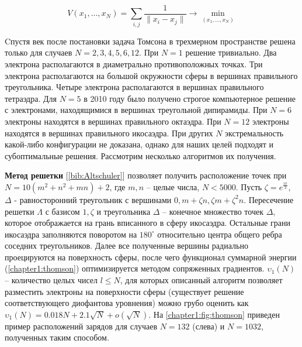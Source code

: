 \begin{equation}\label{chapter1:thomson}
V(x_1, \dots, x_N) = \sum\limits_{i,j} \frac{1}{ \|x_i-x_j\| } \to \min\limits_{(x_1, \dots, x_N)}
\end{equation}

Cпустя век после постановки задача Томсона в трехмерном пространстве решена только для случаев 
$N = 2, 3, 4, 5, 6, 12$. 
При $N = 1$ решение тривиально. 
Два электрона располагаются в диаметрально противоположных точках.
Три электрона располагаются на большой окружности сферы в вершинах правильного треугольника.
Четыре электрона располагаются в вершинах правильного тетраэдра.
Для $N = 5$ в 2010 году было получено строгое компьютерное решение с электронами, находящимися в вершинах треугольной дипирамиды.
При $N = 6$ электроны находятся в вершинах правильного октаэдра.
При $N = 12$ электроны находятся в вершинах правильного икосаэдра.
При других $N$ экстремальность какой-либо конфигурации не доказана, 
однако для наших целей подходят и субоптимальные решения. Рассмотрим несколько алгоритмов их получения.

\textbf{Метод решетки} [\ref{bib:Altschuler}] позволяет получить расположение точек при $N = 10(m^2 + n^2 + mn) + 2$, 
где $m,n$ -- целые числа, $N < 5000$. 
Пусть $\zeta = e^{\frac{i\pi}{3}}$, $\Delta$ - 
равносторонний треугольник с вершинами $0, m + \zeta n, \zeta m + \zeta^2 n$. Пересечение решетки $\Lambda$ с базисом $1, \zeta$ 
и треугольника $\Delta$ -- конечное множество точек $\Delta$, которое отображается на грань вписанного в сферу икосаэдра. 
Остальные грани икосаэдра заполняются поворотом на $180^{\circ}$ относительно центра общего ребра соседних треугольников. 
Далее все полученные вершины радиально проецируются на поверхность сферы, после чего функционал суммарной энергии 
(\ref{chapter1:thomson}) оптимизируется методом сопряженных градиентов. 
$\upsilon_1(N)$ -- количество целых чисел $l \le N$, для которых описанный алгоритм позволяет разместить электроны 
на поверхности сферы (существует решение соответствующего диофантова уровнения) можно грубо оценить как
$\upsilon_1(N) = 0.018N + 2.1\sqrt{N} + o(\sqrt{N})$.
На \figurename{ \ref{chapter1:fig:thomson}} приведен пример расположений зарядов для случаев $N=132$ (слева) и $N=1032$, полученных таким способом.

